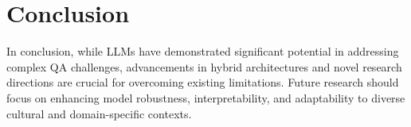 \documentclass{article}
\begin{document}
\section{Conclusion}
In conclusion, while LLMs have demonstrated significant potential in addressing complex QA challenges, advancements in hybrid architectures and novel research directions are crucial for overcoming existing limitations. Future research should focus on enhancing model robustness, interpretability, and adaptability to diverse cultural and domain-specific contexts.



\end{document}
